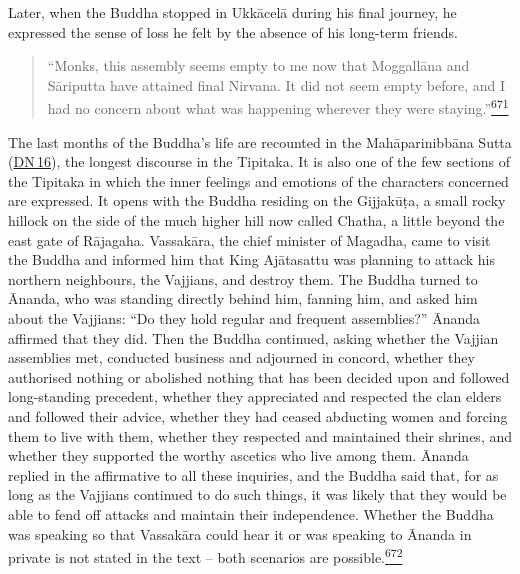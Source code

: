 Later, when the Buddha stopped in Ukkācelā during his final journey, he
expressed the sense of loss he felt by the absence of his long-term
friends.

\begin{quote}
``Monks, this assembly seems empty to me now that Moggallāna and
Sāriputta have attained final Nirvana. It did not seem empty before, and
I had no concern about what was happening wherever they were
staying.''\label{footprints_split_017.html_fnref671}\hyperref[footprints_split_025.htmlux5cux23fn671]{\textsuperscript{671}}
\end{quote}

The last months of the Buddha's life are recounted in the
Mahāparinibbāna Sutta
(\href{https://suttacentral.net/dn16/en/sujato}{DN\,16}), the longest
discourse in the Tipitaka. It is also one of the few sections of the
Tipitaka in which the inner feelings and emotions of the characters
concerned are expressed. It opens with the Buddha residing on the
Gijjakūṭa, a small rocky hillock on the side of the much higher hill now
called Chatha, a little beyond the east gate of Rājagaha. Vassakāra, the
chief minister of Magadha, came to visit the Buddha and informed him
that King Ajātasattu was planning to attack his northern neighbours, the
Vajjians, and destroy them. The Buddha turned to Ānanda, who was
standing directly behind him, fanning him, and asked him about the
Vajjians: ``Do they hold regular and frequent assemblies?'' Ānanda
affirmed that they did. Then the Buddha continued, asking whether the
Vajjian assemblies met, conducted business and adjourned in concord,
whether they authorised nothing or abolished nothing that has been
decided upon and followed long-standing precedent, whether they
appreciated and respected the clan elders and followed their advice,
whether they had ceased abducting women and forcing them to live with
them, whether they respected and maintained their shrines, and whether
they supported the worthy ascetics who live among them. Ānanda replied
in the affirmative to all these inquiries, and the Buddha said that, for
as long as the Vajjians continued to do such things, it was likely that
they would be able to fend off attacks and maintain their independence.
Whether the Buddha was speaking so that Vassakāra could hear it or was
speaking to Ānanda in private is not stated in the text -- both
scenarios are
possible.\label{footprints_split_017.html_fnref672}\hyperref[footprints_split_025.htmlux5cux23fn672]{\textsuperscript{672}}

